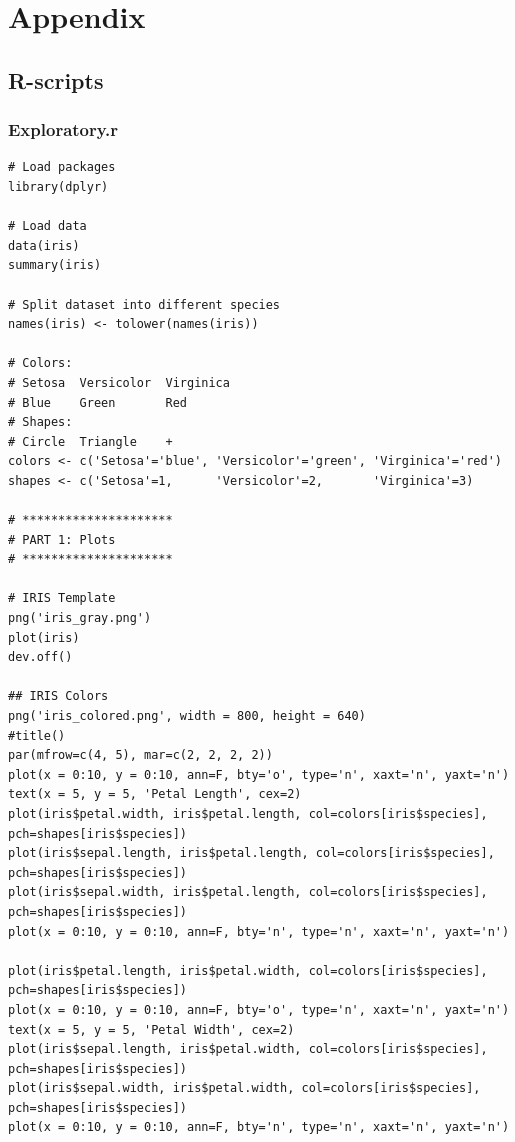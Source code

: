 \documentclass{article}
\begin{document}
\color{black}
\newpage
\section{Appendix}

\subsection{R-scripts}
\subsubsection{Exploratory.r}

\begin{lstlisting}[style=R]
# Load packages
library(dplyr)

# Load data
data(iris)
summary(iris)

# Split dataset into different species
names(iris) <- tolower(names(iris))

# Colors:
# Setosa  Versicolor  Virginica
# Blue    Green       Red
# Shapes:
# Circle  Triangle    +
colors <- c('Setosa'='blue', 'Versicolor'='green', 'Virginica'='red')
shapes <- c('Setosa'=1,      'Versicolor'=2,       'Virginica'=3)

# *********************
# PART 1: Plots
# *********************

# IRIS Template
png('iris_gray.png')
plot(iris)
dev.off()

## IRIS Colors
png('iris_colored.png', width = 800, height = 640)
#title()
par(mfrow=c(4, 5), mar=c(2, 2, 2, 2))
plot(x = 0:10, y = 0:10, ann=F, bty='o', type='n', xaxt='n', yaxt='n')
text(x = 5, y = 5, 'Petal Length', cex=2)
plot(iris$petal.width, iris$petal.length, col=colors[iris$species], pch=shapes[iris$species])
plot(iris$sepal.length, iris$petal.length, col=colors[iris$species], pch=shapes[iris$species])
plot(iris$sepal.width, iris$petal.length, col=colors[iris$species], pch=shapes[iris$species])
plot(x = 0:10, y = 0:10, ann=F, bty='n', type='n', xaxt='n', yaxt='n')

plot(iris$petal.length, iris$petal.width, col=colors[iris$species], pch=shapes[iris$species])
plot(x = 0:10, y = 0:10, ann=F, bty='o', type='n', xaxt='n', yaxt='n')
text(x = 5, y = 5, 'Petal Width', cex=2)
plot(iris$sepal.length, iris$petal.width, col=colors[iris$species], pch=shapes[iris$species])
plot(iris$sepal.width, iris$petal.width, col=colors[iris$species], pch=shapes[iris$species])
plot(x = 0:10, y = 0:10, ann=F, bty='n', type='n', xaxt='n', yaxt='n')



\end{lstlisting}
\end{document}
